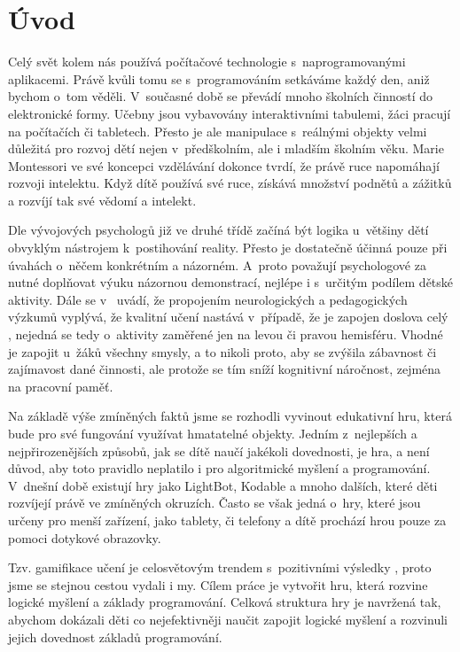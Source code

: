 \chapter{Úvod}

Celý svět kolem nás používá počítačové technologie s~naprogramovanými aplikacemi. Právě kvůli tomu se s~programováním setkáváme každý den, aniž bychom o~tom věděli. V~současné době se převádí mnoho školních činností do elektronické formy. Učebny jsou vybavovány interaktivními tabulemi, žáci pracují na počítačích či tabletech. Přesto je ale manipulace s~reálnými objekty velmi důležitá pro rozvoj dětí nejen v~předškolním, ale i mladším školním věku. Marie Montessori ve své koncepci vzdělávání dokonce tvrdí, že právě ruce napomáhají rozvoji intelektu. Když dítě používá své ruce, získává množství podnětů a zážitků a rozvíjí tak své vědomí a intelekt. \cite{Montessori}
\par
Dle vývojových psychologů \cite{VyvojovaPsychologie} již ve druhé třídě začíná být logika u~většiny dětí obvyklým nástrojem k~postihování reality. Přesto je dostatečně účinná pouze při úvahách o~něčem konkrétním a názorném. A~proto považují psychologové za nutné doplňovat výuku názornou demonstrací, nejlépe i s~určitým podílem dětské aktivity. Dále se v~\cite{ASE} uvádí, že propojením neurologických a pedagogických výzkumů vyplývá, že kvalitní učení nastává v~případě, že je zapojen doslova celý  , nejedná se tedy o~aktivity zaměřené jen na levou či pravou hemisféru. Vhodné je zapojit u~žáků všechny smysly, a to nikoli proto, aby se zvýšila zábavnost či zajímavost dané činnosti, ale protože se tím sníží kognitivní náročnost, zejména na pracovní paměť.
\par
Na základě výše zmíněných faktů jsme se rozhodli vyvinout edukativní hru, která bude pro své fungování využívat hmatatelné objekty. Jedním z~nejlepších a nejpřirozenějších způsobů, jak se dítě naučí jakékoli dovednosti, je hra, a není důvod, aby toto pravidlo neplatilo i pro algoritmické myšlení a programování. V~dnešní době existují hry jako LightBot, Kodable a mnoho dalších, které děti rozvíjejí právě ve zmíněných okruzích. Často se však jedná o~hry, které jsou určeny pro menší zařízení, jako tablety, či telefony a dítě prochází hrou pouze za pomoci dotykové obrazovky.
\par
Tzv. gamifikace učení je celosvětovým trendem s~pozitivními výsledky \cite{Gamification}, proto jsme se stejnou cestou vydali i my. Cílem práce je vytvořit hru, která rozvine logické myšlení a základy programování. Celková struktura hry je navržená tak, abychom dokázali děti co nejefektivněji naučit zapojit logické myšlení a rozvinuli jejich dovednost základů programování.